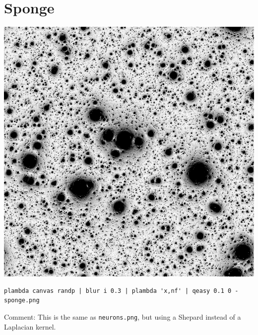 \section{Sponge}
\includegraphics{sponge.png}
\begin{verbatim}
plambda canvas randp | blur i 0.3 | plambda 'x,nf' | qeasy 0.1 0 - sponge.png
\end{verbatim}
Comment: This is the same as \verb+neurons.png+, but using a Shepard instead
of a Laplacian kernel.

